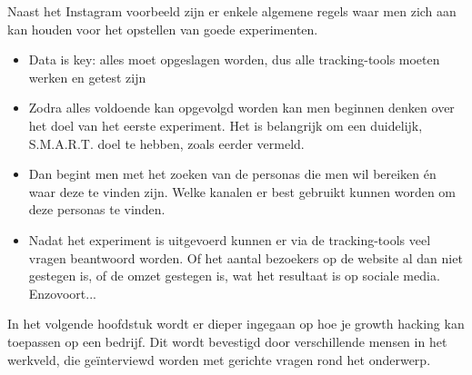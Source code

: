 Naast het Instagram voorbeeld zijn er enkele algemene regels waar men zich aan kan houden voor het opstellen van goede experimenten. 

\begin{itemize}
	\item Data is key: alles moet opgeslagen worden, dus alle tracking-tools moeten werken en getest zijn
	\item Zodra alles voldoende kan opgevolgd worden kan men beginnen denken over het doel van het eerste experiment. Het is belangrijk om een duidelijk, S.M.A.R.T. doel te hebben, zoals eerder vermeld.
	\item Dan begint men met het zoeken van de personas die men wil bereiken én waar deze te vinden zijn. Welke kanalen er best gebruikt kunnen worden om deze personas te vinden.
	\item Nadat het experiment is uitgevoerd kunnen er via de tracking-tools veel vragen beantwoord worden. Of het aantal bezoekers op de website al dan niet gestegen is, of de omzet gestegen is, wat het resultaat is op sociale media. Enzovoort... 
\end{itemize}

In het volgende hoofdstuk wordt er dieper ingegaan op hoe je growth hacking kan toepassen op een bedrijf. Dit wordt bevestigd door verschillende mensen in het werkveld, die geïnterviewd worden met gerichte vragen rond het onderwerp.

